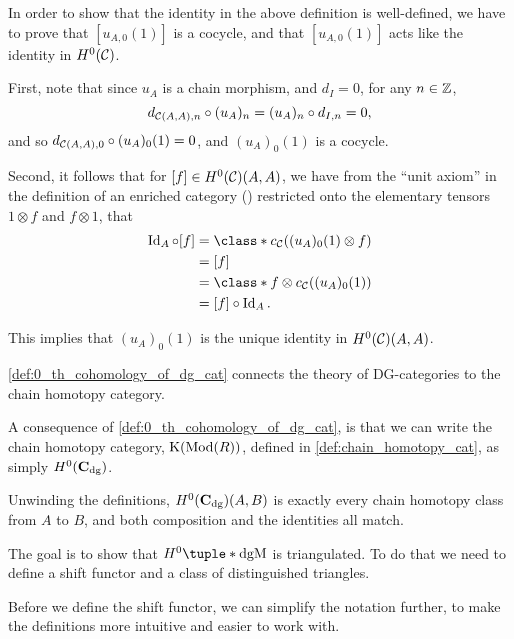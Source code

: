 \begin{remark}
    In order to show that the identity in the above definition is well-defined, we have to prove that \( [u_{A, 0} (1)] \) is a cocycle, and that \( [u_{A, 0} (1)] \) acts like the identity in \( H^0({\mathcal{C}}) \).

    First, note that since \( u_A \) is a chain morphism, and \( d_I = 0 \), for any \( n \in {\mathbb{Z}} \),
    \[
        d_{{\mathcal{C}}(A, A), n} \circ (u_A)_n = (u_A)_n \circ d_{I, n} = 0,
    \]
    and so \( d_{{\mathcal{C}}(A, A), 0} \circ (u_A)_0 (1) = 0 \), and \( (u_A)_0 (1) \) is a cocycle.

    Second, it follows that for \( [f] \in H^0({\mathcal{C}})(A, A) \), we have from the ``unit axiom'' in the definition of an enriched category (\cite[Diagram 6.10]{Borceux_1994}) restricted onto the elementary tensors \( 1 \otimes f \) and \( f \otimes 1 \), that
    \begin{align*}
        \Id_A \circ [f] &= \class*{ c_{\Cc}((u_A)_0 (1) \otimes f) } \\
        &= [f] \\
        &= \class*{ f \otimes c_{\Cc}((u_A)_0 (1)) } \\
        &= [f] \circ \Id_A.
    \end{align*}

    This implies that \( (u_A)_0 (1) \) is the unique identity in \( H^0({\mathcal{C}})(A, A) \).
\end{remark}

\autoref{def:0_th_cohomology_of_dg_cat} connects the theory of DG-categories to the chain homotopy category.

\begin{remark}
    A consequence of \autoref{def:0_th_cohomology_of_dg_cat}, is that we can write the chain homotopy category, \( \operatorname{K}(\operatorname{Mod}(R)) \), defined in \autoref{def:chain_homotopy_cat}, as simply \( H^0(\operatorname{\mathbf{C}}_{\operatorname{dg}}) \).
    
    Unwinding the definitions, \( H^0(\operatorname{\mathbf{C}}_{\operatorname{dg}})(A, B) \) is exactly every chain homotopy class from \( A \) to \( B \), and both composition and the identities all match.
\end{remark}

The goal is to show that \( H^0\tuple*{\dgM} \) is triangulated. To do that we need to define a shift functor and a class of distinguished triangles.

Before we define the shift functor, we can simplify the notation further, to make the definitions more intuitive and easier to work with.

